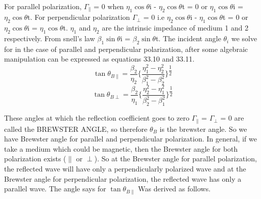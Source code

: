 For parallel polarization, $\Gamma_\parallel$ = 0 when $\eta_1\cos\theta$i - $\eta_2\cos\theta$t = 0 or $\eta_1\cos\theta$i = $\eta_2\cos\theta$t. For perpendicular polarization $\Gamma_\perp$ = 0 i.e $\eta_2\cos\theta$i - $\eta_1\cos\theta$t = 0 or $\eta_2\cos\theta$i = $\eta_1\cos\theta$t. $\eta_1$ and $\eta_2$ are the intrinsic impedance of medium 1 and 2 respectively. From snell's law $\beta_1\sin\theta$i = $\beta_2\sin\theta$t. The incident angle $\theta_i$ we solve for in the case of parallel and perpendicular polarization, after some algebraic manipulation can be expressed as equations 33.10 and 33.11. 
\begin{equation}
\tan\theta_{B\parallel} = \dfrac{\beta_2}{\eta_2} \Bigg\{ \dfrac{\eta_1 ^2 - \eta_2 ^2}{\beta_1 ^2 - \beta_2 ^2} \Bigg\}^{\dfrac{1}{2}}
\end{equation}
\begin{equation}
\tan\theta_{B\perp} = \dfrac{\beta_2}{\eta_1} \Bigg\{ \dfrac{\eta_2 ^2 - \eta_1 ^2}{\beta_2 ^2 - \beta_1 ^2} \Bigg\}^{\dfrac{1}{2}}
\end{equation}

These angles at which the reflection coefficient goes to zero $\Gamma_\parallel$ = $\Gamma_\perp$ = 0 are called the BREWSTER ANGLE, so therefore $\theta_B$ is the brewster angle. So we have Brewster angle for parallel and perpendicular polarization. In general, if we take a medium which could be magnetic, then the Brewster angle for both polarization exists ($\parallel$ or $\perp$). So at the Brewster angle for parallel polarization, the reflected wave will have only a perpendicularly polarized wave and at the Brewster angle for perpendicular polarization, the reflected wave has only a parallel wave. The angle says for $\tan\theta_{B\parallel}$ Was derived as follows.
